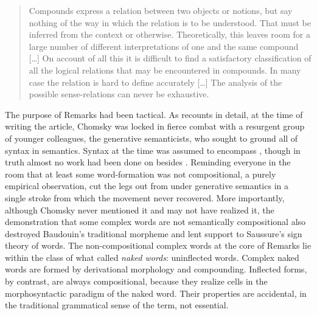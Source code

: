 \documentclass[output=paper]{langsci/langscibook}
\begin{document}
\begin{quote}
Compounds express a relation between two objects or notions, but say
nothing of the way in which the relation is to be understood. That must
be inferred from the context or otherwise. Theoretically, this leaves
room for a large number of different interpretations of one and the same
compound [\ldots] On account of all this it is difficult to find a
satisfactory classification of all the logical relations that may be
encountered in compounds. In many case the relation is hard to define
accurately [\ldots] The analysis of the possible sense-relations can never
be exhaustive. %
\citep[137-138]{Jespersen54}%
%

\end{quote}

The purpose of Remarks had been tactical. As %
\citet{Harris1993} %
%
recounts
in detail, at the time of writing the article, Chomsky was locked in
fierce combat with a resurgent group of younger colleagues, the
generative semanticists, who sought to ground all of syntax in
semantics. Syntax at the time was assumed to encompass ,
though in truth almost no work had been done on  besides
%
\citet{Lees60}%
%
. Reminding everyone in the room that at least some word-formation was 
not compositional, a purely empirical observation, cut the
legs out from under generative semantics in a single stroke from which
the movement never recovered. More importantly, although Chomsky never
mentioned it and may not have realized it, the demonstration that some
complex words are not semantically compositional also destroyed
Baudouin's traditional morpheme and lent support to Saussure's sign
theory of words. The non-compositional complex words at the core of
Remarks lie within the class of what %
\citet{Jespersen54} %
%
called
\emph{naked words}: uninflected words. Complex naked words are formed by
derivational morphology and compounding. Inflected forms, by contrast,
are always compositional, because they realize cells in the
morphosyntactic paradigm of the naked word. Their properties are
accidental, in the traditional grammatical sense of the term, not
essential.
\end{document}
